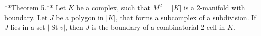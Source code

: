**Theorem 5.** Let $K$ be a complex, such that $M^2 = |K|$ is a 2-manifold with boundary. Let $J$ be a polygon in $|K|$, that forms a subcomplex of a subdivision. If $J$ lies in a set $|\operatorname{St} v|$, then $J$ is the boundary of a combinatorial 2-cell in $K$.
